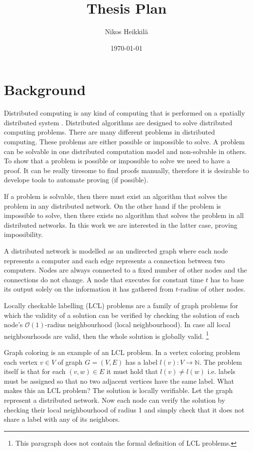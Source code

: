 \documentclass[12pt,a4paper,english,oneside]{article}
\begin{document}
\title{Thesis Plan}
\author{Nikos Heikkilä}
\date{\today}
\maketitle

\section*{Background}

Distributed computing is any kind of computing that is performed on a spatially distributed system
\cite{DBLP:books/el/leeuwen90/LamportL90}.
Distributed algorithms are designed to solve distributed computing problems.
There are many different problems in distributed computing.
These problems are either possible or impossible to solve.
A problem can be solvable in one distributed computation model and non-solvable in others.
To show that a problem is possible or impossible to solve we need to have a proof.
It can be really tiresome to find proofs manually, therefore it is desirable to develope tools to automate proving (if possible).

If a problem is solvable, then there must exist an algorithm that solves the problem in any distributed network.
On the other hand if the problem is impossible to solve, then there exists no algorithm that solves the problem in all distributed networks.
In this work we are interested in the latter case, proving impossibility.

A distributed network is modelled as an undirected graph where each node represents a computer and each edge represents a connection between two computers.
Nodes are always connected to a fixed number of other nodes and the connections do not change.
A node that executes for constant time $t$ has to base its output solely on the information it has gathered from $t$-radius of other nodes.
\cite{DBLP:journals/siamcomp/NaorS95}

Locally checkable labelling (LCL) problems are a family of graph problems for which the validity of a solution can be verified by checking the solution of each node's $\mathcal{O}(1)$-radius neighbourhood (local neighbourhood).
In case all local neighbourhoods are valid, then the whole solution is globally valid.
\cite{DBLP:conf/podc/BrandtHKLOPRSU17}
\footnote{This paragraph does not contain the formal definition of LCL problems.}

Graph coloring is an example of an LCL problem.
In a vertex coloring problem each vertex $v \in V$ of graph $G = (V, E)$ has a label $l(v): V \rightarrow \mathbb{N}$.
The problem itself is that for each $(v, w) \in E$ it must hold that $l(v) \neq l(w)$ i.e. labels must be assigned so that no two adjacent vertices have the same label.
What makes this an LCL problem?
The solution is locally verifiable.
Let the graph represent a distributed network.
Now each node can verify the solution by checking their local neighbourhood of radius 1 and simply check that it does not share a label with any of its neighbors.
\end{document}
